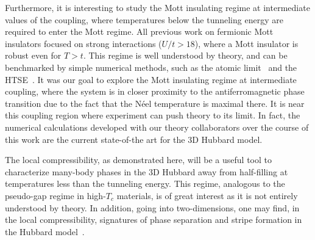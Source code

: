 Furthermore, it is interesting to study the Mott insulating regime at
intermediate values of the coupling, where temperatures below the tunneling
energy are required to enter the Mott regime.  All previous work on fermionic
Mott insulators focused on strong interactions ($U/t>18$), where a Mott
insulator is robust even for $T>t$.  This regime is well understood by theory,
and can be benchmarked by simple numerical methods, such as the atomic
limit~\cite{Jordens2008} and the HTSE~\cite{Jordens2010,Taie2012}.   It was our
goal to explore the Mott insulating regime at intermediate coupling,  where the
system is in closer proximity to the antiferromagnetic phase transition due to
the fact that the N\'{e}el temperature is maximal there.   It is near this
coupling region where experiment can push theory to its limit.   In fact, the
numerical calculations developed with our theory collaborators over the course
of this work are the current state-of-the art for the 3D Hubbard model. 

The local compressibility, as demonstrated here, will be a useful tool to
characterize many-body phases in the 3D Hubbard away from half-filling at
temperatures less than the tunneling energy.   This regime,  analogous to the
pseudo-gap regime in high-$T_{c}$ materials, is of great interest as it is not
entirely understood by theory.  In addition, going into two-dimensions,  one
may find, in the local compressibility, signatures of phase separation and stripe
formation in the Hubbard model~\cite{PhysRevB.81.201101,PhysRevB.80.245102}. 


